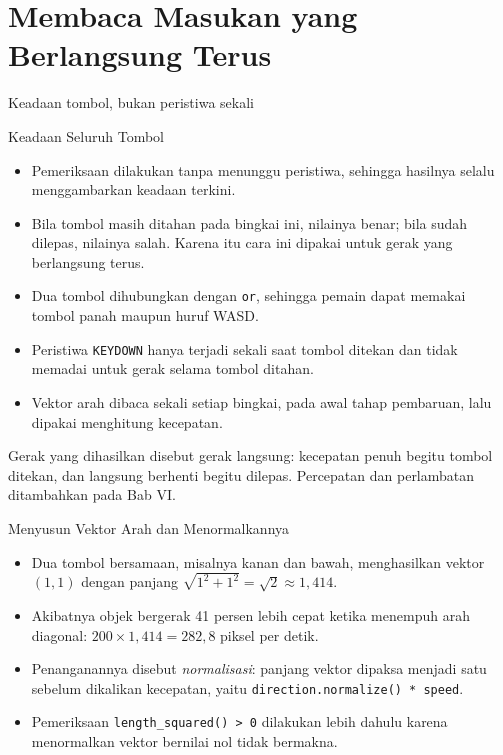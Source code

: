 \documentclass[aspectratio=169,10pt]{beamer}
\begin{document}
\section{Membaca Masukan yang Berlangsung Terus}
  {Keadaan tombol, bukan peristiwa sekali}

\begin{frame}{Keadaan Seluruh Tombol}
\begin{itemize}
  \item Pemeriksaan dilakukan tanpa menunggu peristiwa, sehingga hasilnya selalu
        menggambarkan keadaan terkini.
  \item Bila tombol masih ditahan pada bingkai ini, nilainya benar; bila sudah
        dilepas, nilainya salah. Karena itu cara ini dipakai untuk gerak yang
        berlangsung terus.
  \item Dua tombol dihubungkan dengan \texttt{or}, sehingga pemain dapat memakai
        tombol panah maupun huruf WASD.
  \item Peristiwa \texttt{KEYDOWN} hanya terjadi sekali saat tombol ditekan dan
        tidak memadai untuk gerak selama tombol ditahan.
  \item Vektor arah dibaca sekali setiap bingkai, pada awal tahap pembaruan,
        lalu dipakai menghitung kecepatan.
\end{itemize}
\vspace{0.16cm}
\begin{kotak}
Gerak yang dihasilkan disebut gerak langsung: kecepatan penuh begitu tombol
ditekan, dan langsung berhenti begitu dilepas. Percepatan dan perlambatan
ditambahkan pada Bab VI.
\end{kotak}
\end{frame}

\begin{frame}{Menyusun Vektor Arah dan Menormalkannya}
\centering
{}
\vspace{0.04cm}
\begin{itemize}
  \item Dua tombol bersamaan, misalnya kanan dan bawah, menghasilkan vektor
        $(1, 1)$ dengan panjang $\sqrt{1^2 + 1^2} = \sqrt{2} \approx 1{,}414$.
  \item Akibatnya objek bergerak 41 persen lebih cepat ketika menempuh arah
        diagonal: $200 \times 1{,}414 = 282{,}8$ piksel per detik.
  \item Penanganannya disebut \emph{normalisasi}: panjang vektor dipaksa menjadi
        satu sebelum dikalikan kecepatan, yaitu
        \texttt{direction.normalize() * speed}.
  \item Pemeriksaan \texttt{length\_squared() > 0} dilakukan lebih dahulu karena
        menormalkan vektor bernilai nol tidak bermakna.
\end{itemize}
\end{frame}
\end{document}
